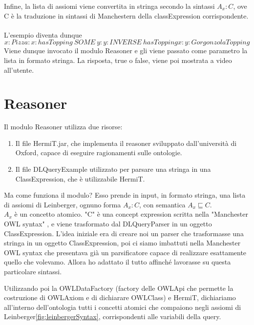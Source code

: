 Infine, la lista di assiomi viene convertita in stringa secondo la sintassi \(A_{x} : C\), ove C è la traduzione in sintassi di Manchestern della classExpression corrispondente. 
\\\\ L'esempio diventa dunque
\[ x : Pizza : x : hasTopping \ SOME \ y : y : INVERSE \ hasTopping x : y : GorgonzolaTopping\]
Viene dunque invocato il modulo Reasoner e gli viene passato come parametro la lista in formato stringa. La risposta, true o false, viene poi mostrata a video all'utente. 

\newpage   
\section{Reasoner}
Il modulo Reasoner utilizza due risorse:
\begin{enumerate}
    \item Il file HermiT.jar\cite{HermiT}, che implementa il reasoner sviluppato dall'università di Oxford, capace di eseguire ragionamenti sulle ontologie.
    \item Il file DLQueryExample\cite{DLQueryExample} utilizzato per parsare una stringa in una ClassExpression, che è utilizzabile HermiT.
\end{enumerate}

Ma come funziona il modulo? Esso prende in input, in formato stringa, una lista di assiomi di Leinberger, ognuno forma \(A_{x} : C\), con semantica \( A_{x}\sqsubseteq C \).
\\\(A_{x}\) è un concetto atomico. "C" è una concept expression scritta nella "Manchester OWL syntax" \cite{ManchesterOWLSyntax}, e viene trasformato dal DLQueryParser in un oggetto ClassExpression. L'idea iniziale era di creare noi un parser che trasformasse una stringa in un oggetto ClassExpression, poi ci siamo imbattuti nella Manchester OWL syntax che presentava già un parsificatore capace di realizzare esattamente quello che volevamo. Allora ho adattato il tutto affinché lavorasse su questa particolare sintassi.

Utilizzando poi la OWLDataFactory (factory delle OWLApi che permette la costruzione di OWLAxiom e di dichiarare OWLClass) e HermiT\cite{HermiT}, dichiariamo all'interno dell'ontologia tutti i concetti atomici che compaiono negli assiomi di Leinberger\ref{fig:leinbergerSyntax}, corrispondenti alle variabili della query.

